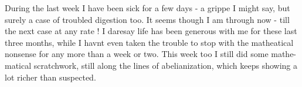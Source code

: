During the last week I have been sick for a few days - a grippe
I might say, but surely a case of troubled digestion too. It seems
though I am through now - till the next case at any rate ! I daresay
life has been generous with me for these last three months, while I
havnt even taken the trouble to stop with the matheatical nonsense
for any more than a week or two. This week too I still did some mathe-%
matical scratchwork, still along the lines of abelianization, which
keeps showing a lot richer than suspected.


